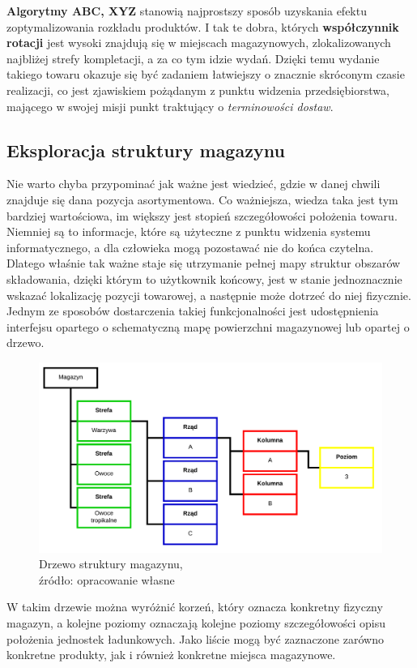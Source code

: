 		\textbf{Algorytmy ABC, XYZ} stanowią najprostszy sposób uzyskania efektu zoptymalizowania rozkładu produktów. I tak
		te dobra, których \textbf{współczynnik rotacji} jest wysoki znajdują się w miejscach magazynowych, zlokalizowanych
		najbliżej strefy kompletacji, a za co tym idzie wydań. Dzięki temu wydanie takiego towaru okazuje się być
		zadaniem łatwiejszy o znacznie skróconym czasie realizacji, co jest zjawiskiem pożądanym z punktu widzenia przedsiębiorstwa,
		mającego w swojej misji punkt traktujący o \textit{terminowości dostaw}. \\ 
	\subsection{Eksploracja struktury magazynu}
		Nie warto chyba przypominać jak ważne jest wiedzieć, gdzie w danej chwili znajduje się dana pozycja asortymentowa.
		Co ważniejsza, wiedza taka jest tym bardziej wartościowa, im większy jest stopień szczegółowości położenia towaru. 
		Niemniej są to informacje, które są użyteczne z punktu widzenia systemu informatycznego, a dla człowieka mogą
		pozostawać nie do końca czytelna. Dlatego właśnie tak ważne staje się utrzymanie pełnej mapy struktur obszarów
		składowania, dzięki którym to użytkownik końcowy, jest w stanie jednoznacznie wskazać lokalizację pozycji towarowej,
		a następnie może dotrzeć do niej fizycznie. Jednym ze sposobów dostarczenia takiej funkcjonalności jest 
		udostępnienia interfejsu opartego o schematyczną mapę powierzchni magazynowej lub opartej o drzewo. 
		\begin{figure}[h]
			\centering
			\includegraphics[width=\textwidth]{images/warehouse_tree}
			\caption[Przykładowe drzewo eksploracji magazynu]{
				Drzewo struktury magazynu,\\
				źródło: opracowanie własne
			}
		\end{figure}
		W takim drzewie można wyróżnić korzeń, który oznacza konkretny fizyczny magazyn, a kolejne poziomy oznaczają 
		kolejne poziomy szczegółowości opisu położenia jednostek ładunkowych. Jako liście mogą być zaznaczone zarówno
		konkretne produkty, jak i również konkretne miejsca magazynowe. \\
		
